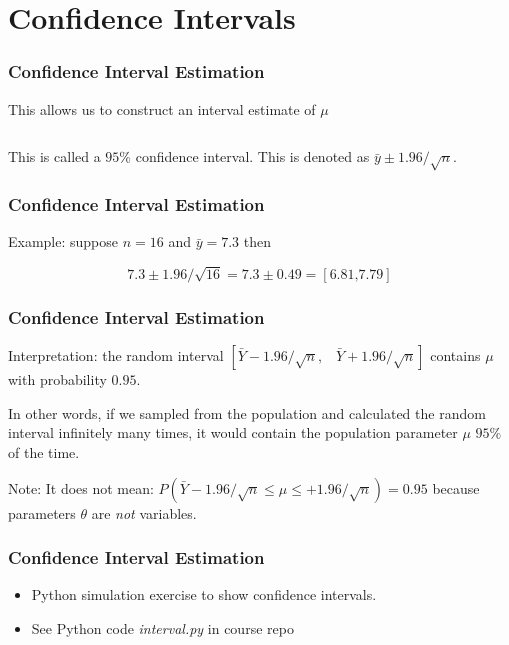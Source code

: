 \documentclass[12pt]{beamer}
\begin{document}
\section{Confidence Intervals}
\begin{frame}
\frametitle{Confidence Interval Estimation}
\vspace{2mm}
This allows us to construct an interval estimate of $\mu$

\begin{equation*}
[\bar{y} - 1.96/\sqrt{n}, \quad \bar{y} + 1.96/\sqrt{n} ]
\end{equation*}

This is called a $95\%$ confidence interval. This is denoted as $\bar{y} \pm 1.96/\sqrt{n}$.
\end{frame}


\begin{frame}
\frametitle{Confidence Interval Estimation}
\vspace{2mm}
Example: suppose $n = 16$ and $\bar{y} = 7.3$ then

\vspace{3mm}
\begin{equation*}
7.3 \pm 1.96/\sqrt{16} = 7.3 \pm 0.49 = [6.81 \mbox{,} 7.79]
\end{equation*}
\end{frame}

\begin{frame}
\frametitle{Confidence Interval Estimation}
\vspace{2mm}
Interpretation: the random interval $[\bar{Y} - 1.96/\sqrt{n} \mbox{,} \quad \bar{Y} + 1.96/\sqrt{n}]$
contains $\mu$ with probability $0.95$.

\vspace{2mm}
In other words, if we sampled from the population and calculated the random interval infinitely
many times, it would contain the population parameter $\mu$ $95\%$ of the time.

\vspace{2mm}
Note: It does not mean: $P(\bar{Y} - 1.96/\sqrt{n} \leq \mu \leq + 1.96/\sqrt{n}) = 0.95$ 
because parameters $\theta$ are \textit{not} variables. 
\end{frame}

\begin{frame}
\frametitle{Confidence Interval Estimation}
\begin{itemize}
 \item Python simulation exercise to show confidence intervals.
 \item See Python code \emph{interval.py} in course repo
\end{itemize}
\end{frame}
\end{document}
